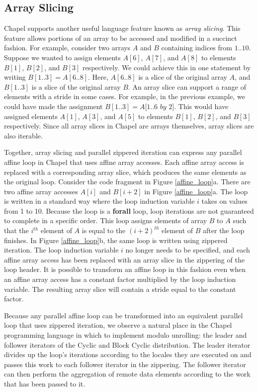 \subsection{Array Slicing}\label{sec:array_slicing}

Chapel supports another useful language feature known as \textit{array slicing}. This feature allows portions of an array to be accessed and modified in a succinct fashion. For example, consider two arrays $A$ and $B$ containing indices from $1..10$. Suppose we wanted to assign elements $A[6]$, $A[7]$, and $A[8]$ to elements $B[1]$, $B[2]$, and $B[3]$ respectively. We could achieve this in one statement by writing $B[1..3] = A[6..8]$. Here, $A[6..8]$ is a slice of the original array $A$, and $B[1..3]$ is a slice of the original array $B$. An array slice can support a range of elements with a stride in some cases. For example, in the previous example, we could have made the assignment $B[1..3] = A[1..6$ $by$ $2]$. This would have assigned elements $A[1]$, $A[3]$, and $A[5]$ to elements $B[1]$, $B[2]$, and $B[3]$ respectively. Since all array slices in Chapel are arrays themselves, array slices are also iterable. 

Together, array slicing and parallel zippered iteration can express any parallel affine loop in Chapel that uses affine array accesses. Each affine array access is replaced with a corresponding array slice, which produces the same elements as the original loop. Consider the code fragment in Figure \ref{affine_loop}a. There are two affine array accesses $A[i]$ and $B[i+2]$ in Figure \ref{affine_loop}a. The loop is written in a standard way where the loop induction variable $i$ takes on values from 1 to 10. Because the loop is a \textbf{forall} loop, loop iterations are not guaranteed to complete in a specific order. This loop assigns elements of array $B$ to $A$ such that the $i^{th}$ element of $A$ is equal to the $(i+2)^{th}$ element of $B$ after the loop finishes. In Figure \ref{affine_loop}b, the same loop is written using zippered iteration. The loop induction variable $i$ no longer needs to be specified, and each affine array access has been replaced with an array slice in the zippering of the loop header. It is possible to transform an affine loop in this fashion even when an affine array access has a constant factor multiplied by the loop induction variable. The resulting array slice will contain a stride equal to the constant factor.

Because any parallel affine loop can be transformed into an equivalent parallel loop that uses zippered iteration, we observe a natural place in the Chapel programming language in which to implement modulo unrolling: the leader and follower iterators of the Cyclic and Block Cyclic distribution. The leader iterator divides up the loop's iterations according to the locales they are executed on and passes this work to each follower iterator in the zippering. The follower iterator can then perform the aggregation of remote data elements according to the work that has been passed to it. 

